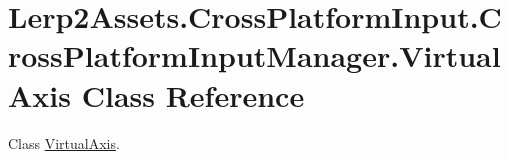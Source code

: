 \hypertarget{class_lerp2_assets_1_1_cross_platform_input_1_1_cross_platform_input_manager_1_1_virtual_axis}{}\section{Lerp2\+Assets.\+Cross\+Platform\+Input.\+Cross\+Platform\+Input\+Manager.\+Virtual\+Axis Class Reference}
\label{class_lerp2_assets_1_1_cross_platform_input_1_1_cross_platform_input_manager_1_1_virtual_axis}


Class \hyperlink{class_lerp2_assets_1_1_cross_platform_input_1_1_cross_platform_input_manager_1_1_virtual_axis}{Virtual\+Axis}.  


